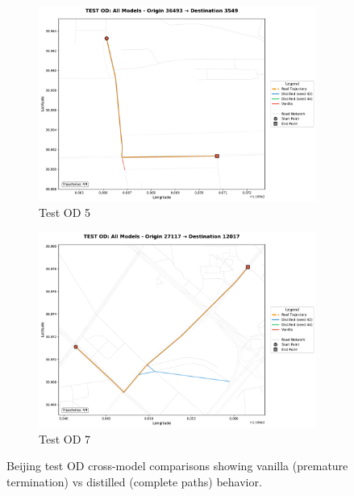 \begin{figure}[H]
\begin{subfigure}{0.49\linewidth}
        \includegraphics[width=\linewidth]{assets/plots/eval/beijing/cross_model/test_od_comparison_5_origin36493_dest3549.pdf}
        \caption{Test OD 5}
    \end{subfigure}
    \begin{subfigure}{0.49\linewidth}
        \centering
        \includegraphics[width=\linewidth]{assets/plots/eval/beijing/cross_model/test_od_comparison_7_origin27117_dest12017.pdf}
        \caption{Test OD 7}
    \end{subfigure}
    \caption{Beijing test OD cross-model comparisons showing vanilla (premature termination) vs distilled (complete paths) behavior.}
    \label{fig:appendix-beijing-cross-test}
\end{figure}

